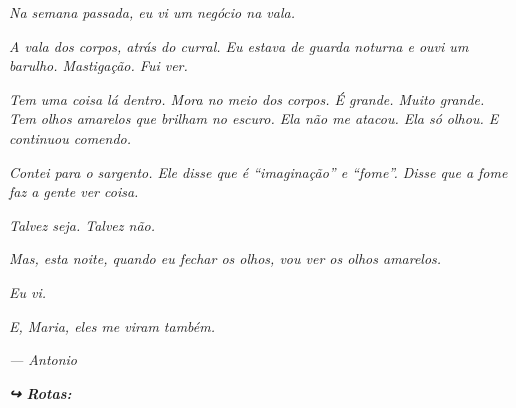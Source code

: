 \noindent \textit{Na semana passada, eu vi um negócio na vala.}

\noindent \textit{A vala dos corpos, atrás do curral. Eu estava de guarda noturna e ouvi um barulho. Mastigação. Fui ver.}

\noindent \textit{Tem uma coisa lá dentro. Mora no meio dos corpos. É grande. Muito grande. Tem olhos amarelos que brilham no escuro. Ela não me atacou. Ela só olhou. E continuou comendo.}

\noindent \textit{Contei para o sargento. Ele disse que é \textquotedblleft{}imaginação\textquotedblright{} e \textquotedblleft{}fome\textquotedblright{}. Disse que a fome faz a gente ver coisa.}

\noindent \textit{Talvez seja. Talvez não.}

\noindent \textit{Mas, esta noite, quando eu fechar os olhos, vou ver os olhos amarelos.}

\noindent \textit{Eu vi.}

\noindent \textit{E, Maria, eles me viram também.}

\noindent \textit{--- Antonio}

\vspace{0.5em}
\noindent\textit{\textbf{↪ Rotas:}  \rotasep {}}
